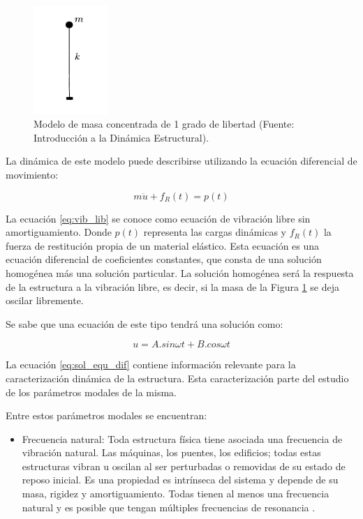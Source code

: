 \begin{itemize}
    \begin{figure}[H]
        \centering
        \includegraphics[width = 0.25\textwidth]{imagenes/cap1_marcoteo/modelo_masa_simple.png}
        \caption{Modelo de masa concentrada de 1 grado de libertad (Fuente: Introducción a la Dinámica Estructural).}
        \label{fig:masa_estructural}
    \end{figure}

    La dinámica de este modelo puede describirse utilizando la ecuación diferencial de movimiento:

    \begin{equation} \label{eq:vib_lib}
        m\ddot{u} + f_R(t) = p(t)
    \end{equation}

    La ecuación \ref{eq:vib_lib} se conoce como ecuación de vibración libre sin amortiguamiento. Donde $p(t)$ representa las cargas dinámicas y $f_R(t)$ la fuerza de restitución propia de un material elástico.  Esta ecuación es una ecuación diferencial de coeficientes constantes, que consta de una solución homogénea más una solución particular. La solución homogénea será la respuesta de la estructura a la vibración libre, es decir, si la masa de la Figura \ref{fig:masa_estructural} se deja oscilar libremente.

    Se sabe que una ecuación de este tipo tendrá una solución como:

    \begin{equation} \label{eq:sol_equ_dif}
        u = A.sin\omega t + B.cos\omega t
    \end{equation}

    La ecuación \ref{eq:sol_equ_dif} contiene información relevante para la caracterización dinámica de la estructura. Esta caracterización parte del estudio de los parámetros modales de la misma.

    Entre estos parámetros modales se encuentran: 
        \begin{itemize}
            \item Frecuencia natural: Toda estructura física tiene asociada una frecuencia de vibración natural. Las máquinas, los puentes, los edificios; todas estas estructuras vibran u oscilan al ser perturbadas o removidas de su estado de reposo inicial. Es una propiedad es intrínseca del sistema y depende de su masa, rigidez y amortiguamiento. Todas tienen al menos una frecuencia natural y es posible que tengan múltiples frecuencias de resonancia \citep{irvine2000introduction}. 
            

\end{itemize}
\end{itemize}
